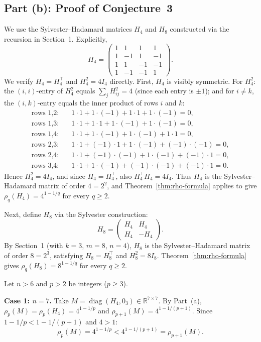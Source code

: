 \subsection*{Part (b): Proof of Conjecture~3}

We use the Sylvester--Hadamard matrices $H_4$ and $H_8$ constructed via the recursion in Section~1. Explicitly,
\[
H_4 = \begin{pmatrix} 1&1&1&1\\ 1&-1&1&-1\\ 1&1&-1&-1\\ 1&-1&-1&1 \end{pmatrix}.
\]
We verify $H_4 = H_4^\top$ and $H_4^2 = 4I_4$ directly. First, $H_4$ is visibly symmetric. For $H_4^2$: the $(i,i)$-entry of $H_4^2$ equals $\sum_j H_{ij}^2 = 4$ (since each entry is $\pm 1$); and for $i\neq k$, the $(i,k)$-entry equals the inner product of rows $i$ and $k$:
\begin{align*}
\text{rows 1,2:}&\quad 1\cdot1+1\cdot(-1)+1\cdot1+1\cdot(-1)=0, \\
\text{rows 1,3:}&\quad 1\cdot1+1\cdot1+1\cdot(-1)+1\cdot(-1)=0, \\
\text{rows 1,4:}&\quad 1\cdot1+1\cdot(-1)+1\cdot(-1)+1\cdot1=0, \\
\text{rows 2,3:}&\quad 1\cdot1+(-1)\cdot1+1\cdot(-1)+(-1)\cdot(-1)=0, \\
\text{rows 2,4:}&\quad 1\cdot1+(-1)\cdot(-1)+1\cdot(-1)+(-1)\cdot1=0, \\
\text{rows 3,4:}&\quad 1\cdot1+1\cdot(-1)+(-1)\cdot(-1)+(-1)\cdot1=0.
\end{align*}
Hence $H_4^2 = 4I_4$, and since $H_4 = H_4^\top$, also $H_4^\top H_4 = 4I_4$. Thus $H_4$ is the Sylvester--Hadamard matrix of order $4 = 2^2$, and Theorem~\ref{thm:rho-formula} applies to give $\rho_q(H_4) = 4^{1-1/q}$ for every $q \geq 2$.

Next, define $H_8$ via the Sylvester construction:
\[
H_8 = \begin{pmatrix} H_4 & H_4 \\ H_4 & -H_4 \end{pmatrix}.
\]
By Section~1 (with $k=3$, $m=8$, $n=4$), $H_8$ is the Sylvester--Hadamard matrix of order $8=2^3$, satisfying $H_8 = H_8^\top$ and $H_8^2 = 8I_8$. Theorem~\ref{thm:rho-formula} gives $\rho_q(H_8) = 8^{1-1/q}$ for every $q \geq 2$.

\medskip

Let $n > 6$ and $p > 2$ be integers ($p \geq 3$).

\textbf{Case 1: $n = 7$.} Take $M = \operatorname{diag}(H_4, 0_3) \in \mathbb{R}^{7\times 7}$. By Part~(a), $\rho_p(M) = \rho_p(H_4) = 4^{1-1/p}$ and $\rho_{p+1}(M) = 4^{1-1/(p+1)}$. Since $1-1/p < 1-1/(p+1)$ and $4 > 1$:
\[
\rho_p(M) = 4^{1-1/p} < 4^{1-1/(p+1)} = \rho_{p+1}(M).
\]

